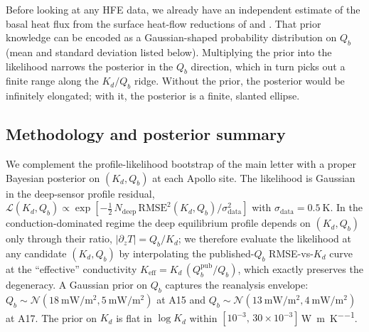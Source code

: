 \documentclass[11pt]{report}
\begin{document}
\begin{aside}
Before looking at any HFE data, we already have an independent
estimate of the basal heat flux from the surface heat-flow
reductions of \citet{langseth1976} and \citet{saito2007,nagihara2018}.
That prior knowledge can be encoded as a Gaussian-shaped probability
distribution on $Q_b$ (mean and standard deviation listed below).
Multiplying the prior into the likelihood narrows the posterior in
the $Q_b$ direction, which in turn picks out a finite range along
the $K_d/Q_b$ ridge. Without the prior, the posterior would be
infinitely elongated; with it, the posterior is a finite, slanted
ellipse.
\end{aside}

\subsection*{Methodology and posterior summary}

We complement the profile-likelihood bootstrap of the main letter
with a proper Bayesian posterior on $(K_d, Q_b)$ at each Apollo
site. The likelihood is Gaussian in the deep-sensor profile
residual, $\mathcal{L}(K_d, Q_b) \propto \exp[-\tfrac{1}{2}\,
N_\mathrm{deep}\,\mathrm{RMSE}^2(K_d, Q_b)/\sigma_\mathrm{data}^2]$
with $\sigma_\mathrm{data}=\SI{0.5}{\kelvin}$. In the
conduction-dominated regime the deep equilibrium profile depends
on $(K_d, Q_b)$ only through their ratio, $|\partial_z T|=Q_b/K_d$;
we therefore evaluate the likelihood at any candidate $(K_d, Q_b)$
by interpolating the published-$Q_b$ RMSE-vs-$K_d$ curve at the
``effective'' conductivity $K_\mathrm{eff} = K_d\,(Q_b^\mathrm{pub}/Q_b)$,
which exactly preserves the degeneracy. A Gaussian prior on $Q_b$
captures the \citet{saito2007,nagihara2018} reanalysis envelope:
$Q_b\sim\mathcal{N}(\SI{18}{\milli\watt\per\meter\squared}, \SI{5}{\milli\watt\per\meter\squared})$ at A15 and
$Q_b\sim\mathcal{N}(\SI{13}{\milli\watt\per\meter\squared}, \SI{4}{\milli\watt\per\meter\squared})$ at A17. The prior on $K_d$ is flat in $\log K_d$
within $[10^{-3},\,30\times 10^{-3}]$\,\si{\watt\per\meter\per\kelvin}.
\end{document}
